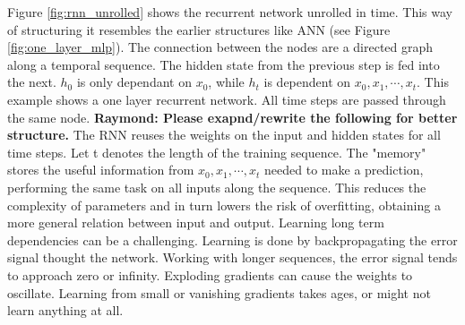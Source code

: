 
Figure \ref{fig:rnn_unrolled} shows the recurrent network unrolled in time. This way of structuring it resembles the earlier structures like ANN (see Figure \ref{fig:one_layer_mlp}). The connection between the nodes %
are a directed graph along a temporal sequence. The hidden state from the previous step is fed into the next. $h_0$ is only dependant on $x_0$, while $h_t$ is dependent on $x_0, x_1, \cdots, x_t $. This example shows a one layer recurrent network. All time steps are passed through the same node. \textbf{Raymond: Please exapnd/rewrite the following for better structure.} The RNN reuses the weights on the input and hidden states for all time steps. Let t denotes the length of the training sequence. The "memory" stores the useful information from $x_0, x_1, \cdots, x_t $ needed to make a prediction, performing the same task on all inputs along the sequence. This reduces the complexity of parameters and in turn lowers the risk of overfitting, obtaining a more general relation between input and output.
Learning long term dependencies can be a challenging. Learning is done by backpropagating the error signal thought the network. Working with longer sequences, the error signal tends to approach zero or infinity. Exploding gradients can cause the weights to oscillate. Learning from small or vanishing gradients takes ages, or might not learn anything at all. 

